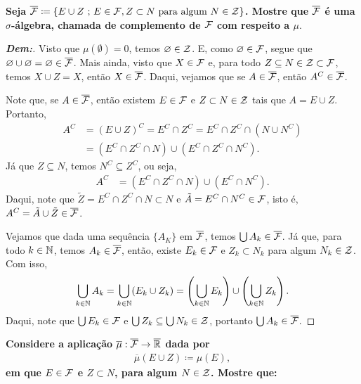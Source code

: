 \biglinend 
{}
\myexe{\thedois}
\bigline
\textbf{Seja $\overline{\mathcal F} \coloneq \{E\cup Z\text{ ; } E \in \mathcal F, Z \subset N\text{ para algum }N\in \mathcal Z\}$.
Mostre que $\overline{\mathcal F}$ é uma $\sigma$-álgebra, chamada de complemento de $\mathcal F$ com respeito a $\mu$}.
\begin{proof}[\textbf{Dem:}]
Visto que $\mu(\emptyset) = 0$, temos $\varnothing \in \mathcal Z$. E, como $\varnothing \in \mathcal F$, segue que 
  $\varnothing \cup \varnothing = \varnothing \in \overline{\mathcal F}$. Mais ainda, visto que $X \in \mathcal F$ e, 
  para todo $Z \subseteq N \in \mathcal Z \subset \mathcal F$, temos $X \cup Z = X$, então $X \in \overline{\mathcal F}$. 
  Daqui, vejamos que se $A \in \overline{\mathcal F}$, então $A^C \in \overline{\mathcal F}$.
  
  \noindent 
  Note que, se $A \in \overline{\mathcal F}$, então existem $E \in
  \mathcal F$ e $Z \subset N\in\mathcal Z$
  tais que $A = E \cup Z$. Portanto, 
  \begin{align*}
    A^C &= (E \cup Z)^C = E^C \cap Z^C = E^C\cap Z^C \cap (N \cup N^C)\\
    &= (E^C \cap Z^C \cap N) \cup (E^C \cap Z^C \cap N^C).
  \end{align*}
  Já que $Z \subseteq N$, temos $N^C \subseteq Z^C$, ou seja, 
  \begin{align*}
    A^C &= (E^C \cap Z^C \cap N) \cup (E^C \cap N^C).
  \end{align*}
  Daqui, note que $\tilde Z = E^C \cap Z^C \cap N \subset N$ e $\tilde A = E^C \cap N^C \in 
  \mathcal F$, isto é, $A^C = \tilde A \cup \tilde Z \in \overline{\mathcal F}$. 

  \noindent
  Vejamos que dada uma sequência $\{A_K\}$ em $\overline{\mathcal F}$,
  temos $\bigcup A_k \in \overline{\mathcal F}$. Já que, para todo 
  $k \in \mathbb N$, temos $A_k \in \overline{\mathcal F}$, então, existe $E_k \in \mathcal F$ e 
  $Z_k \subset N_k$ para algum $N_k \in \mathcal Z$. Com isso, 
  \begin{align*}
    \bigcup_{k \in \mathbb N} A_k = \bigcup_{k \in \mathbb N} (E_k \cup Z_k) = 
    \left(\bigcup_{k \in \mathbb N} E_k \right)\cup \left(\bigcup_{k \in \mathbb N} Z_k\right).
  \end{align*}
  Daqui, note que $\bigcup E_k \in \mathcal F$ e $\bigcup Z_k \subseteq 
  \bigcup N_k \in \mathcal Z$, portanto $\bigcup A_k \in \overline{\mathcal F}$.
\end{proof}
\biglinend 
{}
\myexe{\thedois}
\bigline
\textbf{Considere a aplicação $\overline \mu: \overline{\mathcal F} \rightarrow \overline {\mathbb R}$ dada por 
\begin{align*}
  \overline \mu (E\cup Z) \coloneq \mu(E),
\end{align*}
em que $E\in \mathcal F$ e $Z \subset N$, para algum $N \in \mathcal Z$. Mostre que:} 

